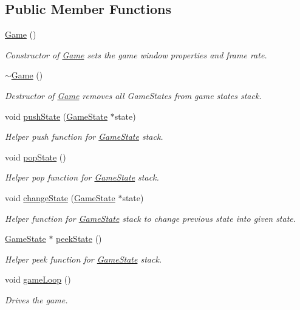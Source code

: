 \subsection*{Public Member Functions}
\begin{DoxyCompactItemize}
\item 
\hyperlink{class_game_ad59df6562a58a614fda24622d3715b65}{Game} ()
\begin{DoxyCompactList}\small\item\em Constructor of \hyperlink{class_game}{Game} sets the game window properties and frame rate. \end{DoxyCompactList}\item 
\hyperlink{class_game_ae3d112ca6e0e55150d2fdbc704474530}{$\sim$\+Game} ()
\begin{DoxyCompactList}\small\item\em Destructor of \hyperlink{class_game}{Game} removes all Game\+States from game states stack. \end{DoxyCompactList}\item 
void \hyperlink{class_game_a5898f1edb6e3bc1700b2ffb1943bc609}{push\+State} (\hyperlink{class_game_state}{Game\+State} $\ast$state)
\begin{DoxyCompactList}\small\item\em Helper push function for \hyperlink{class_game_state}{Game\+State} stack. \end{DoxyCompactList}\item 
void \hyperlink{class_game_a4b33dd67adef59bebadba8a234282c88}{pop\+State} ()
\begin{DoxyCompactList}\small\item\em Helper pop function for \hyperlink{class_game_state}{Game\+State} stack. \end{DoxyCompactList}\item 
void \hyperlink{class_game_a8683b16995200bd11d95efc372e6722a}{change\+State} (\hyperlink{class_game_state}{Game\+State} $\ast$state)
\begin{DoxyCompactList}\small\item\em Helper function for \hyperlink{class_game_state}{Game\+State} stack to change previous state into given state. \end{DoxyCompactList}\item 
\hyperlink{class_game_state}{Game\+State} $\ast$ \hyperlink{class_game_a6cdc6cb374ab8e7d8ac9b280284b3793}{peek\+State} ()
\begin{DoxyCompactList}\small\item\em Helper peek function for \hyperlink{class_game_state}{Game\+State} stack. \end{DoxyCompactList}\item 
void \hyperlink{class_game_aede5f46c8c7bbbaf8459eeec397a11e7}{game\+Loop} ()
\begin{DoxyCompactList}\small\item\em Drives the game. \end{DoxyCompactList}\end{DoxyCompactItemize}
